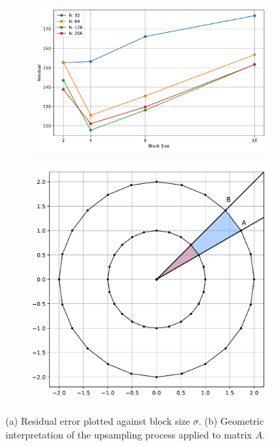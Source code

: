 \begin{figure}[H]
    \centering
    \begin{subfigure}[t]{0.51\linewidth}
        \centering
        \includegraphics[width=\linewidth]{images/tuning/lls_residuals_by_pegs_and_block_size.pdf}
        \caption{}
    \end{subfigure}%
    \hfill
    \begin{subfigure}[t]{0.33\linewidth}
        \centering
        \includegraphics[width=\linewidth]{images/tuning/upsampling.pdf}
        \caption{}
        \label{fig:upsampling_A}
    \end{subfigure}
    \caption{(a) Residual error plotted against block size \(\sigma\). (b) Geometric interpretation of the upsampling process applied to matrix \(A\).}
    \label{fig:lss_residuals_by_pegs_ds}
\end{figure}

